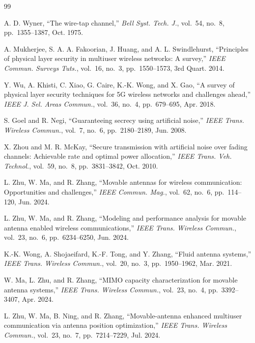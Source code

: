 \documentclass[journal]{IEEEtran}
\begin{document}
\begin{thebibliography}{99}

A. D. Wyner, ``The wire-tap channel,'' \emph{Bell Syst. Tech. J.}, vol.~54, no.~8, pp.~1355--1387, Oct. 1975.

A. Mukherjee, S. A. A. Fakoorian, J. Huang, and A. L. Swindlehurst, ``Principles of physical layer security in multiuser wireless networks: A survey,'' \emph{IEEE Commun. Surveys Tuts.}, vol.~16, no.~3, pp.~1550--1573, 3rd Quart. 2014.

Y. Wu, A. Khisti, C. Xiao, G. Caire, K.-K. Wong, and X. Gao, ``A survey of physical layer security techniques for 5G wireless networks and challenges ahead,'' \emph{IEEE J. Sel. Areas Commun.}, vol.~36, no.~4, pp.~679--695, Apr. 2018.

S. Goel and R. Negi, ``Guaranteeing secrecy using artificial noise,'' \emph{IEEE Trans. Wireless Commun.}, vol.~7, no.~6, pp.~2180--2189, Jun. 2008.

X. Zhou and M. R. McKay, ``Secure transmission with artificial noise over fading channels: Achievable rate and optimal power allocation,'' \emph{IEEE Trans. Veh. Technol.}, vol.~59, no.~8, pp.~3831--3842, Oct. 2010.

L. Zhu, W. Ma, and R. Zhang, ``Movable antennas for wireless communication: Opportunities and challenges,'' \emph{IEEE Commun. Mag.}, vol.~62, no.~6, pp.~114--120, Jun. 2024.

L. Zhu, W. Ma, and R. Zhang, ``Modeling and performance analysis for movable antenna enabled wireless communications,'' \emph{IEEE Trans. Wireless Commun.}, vol.~23, no.~6, pp.~6234--6250, Jun. 2024.

K.-K. Wong, A. Shojaeifard, K.-F. Tong, and Y. Zhang, ``Fluid antenna systems,'' \emph{IEEE Trans. Wireless Commun.}, vol.~20, no.~3, pp.~1950--1962, Mar. 2021.

W. Ma, L. Zhu, and R. Zhang, ``MIMO capacity characterization for movable antenna systems,'' \emph{IEEE Trans. Wireless Commun.}, vol.~23, no.~4, pp.~3392--3407, Apr. 2024.

L. Zhu, W. Ma, B. Ning, and R. Zhang, ``Movable-antenna enhanced multiuser communication via antenna position optimization,'' \emph{IEEE Trans. Wireless Commun.}, vol.~23, no.~7, pp.~7214--7229, Jul. 2024.


\end{thebibliography}
\end{document}
